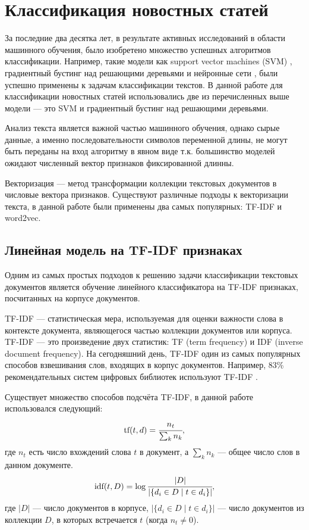 \documentclass[a4paper, 14pt]{extarticle}
\begin{document}
\section{Классификация новостных статей}
За последние два десятка лет, в результате активных исследований в области машинного обучения,
было изобретено множество успешных алгоритмов классификации. Например, такие модели как support vector machines (SVM) \cite{weston99svms},
градиентный бустинг над решающими деревьями и нейронные сети \cite{DBLP:journals/corr/ConneauSBL16}, были успешно применены к задачам классификации текстов.
В данной работе для классификации новостных статей использовались две из перечисленных выше модели --- это SVM и градиентный бустинг
над решающими деревьями.

Анализ текста является важной частью машинного обучения, однако сырые данные, а именно последовательности символов переменной длины,
не могут быть переданы на вход алгоритму в явном виде т.к. большинство моделей ожидают численный вектор признаков фиксированной длинны.

Векторизация --- метод трансформации коллекции текстовых документов в числовые вектора признаков.
Существуют различные подходы к векторизации текста, в данной работе были применены два самых популярных: TF-IDF и word2vec.

\subsection{Линейная модель на TF-IDF признаках}
Одним из самых простых подходов к решению задачи классификации текстовых документов является обучение линейного классификатора на
TF-IDF признаках, посчитанных на корпусе документов.

TF-IDF --- статистическая мера, используемая для оценки важности слова в контексте 
документа, являющегося частью коллекции документов или корпуса.\cite{doi:10.1108/eb026526}
TF-IDF --- это произведение двух статистик: TF (term frequency) и IDF (inverse 
document frequency). На сегодняшний день, TF-IDF один из самых популярных способов взвешивания слов, входящих в корпус документов.
Например, 83\% рекомендательных систем цифровых библиотек используют TF-IDF \cite{Beel2016}.

Существует множество способов подсчёта TF-IDF, в данной работе использовался следующий:
$$
\text{tf}(t, d) = \cfrac{n_t}{\sum_{k} n_k},
$$
где $n_{t}$ есть число вхождений слова $t$ в документ, а $\sum_{k} n_k$ --- общее число слов в данном документе.
$$
\text{idf}(t, D) = \log{ \cfrac{|D|}{|\{ d_i \in D \mid t \in d_i \}|}},
$$
где $|D|$ --- число документов в корпусе, $|\{ d_i \in D \mid t \in d_i \}|$ — число документов из коллекции $D$, в которых встречается 
$t$ (когда $n_{t} \neq 0$).
\end{document}
